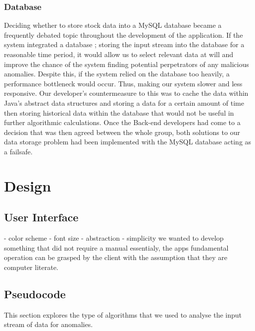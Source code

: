 \documentclass[12pt]{article}
\begin{document}
    \subsubsection{Database}
    Deciding whether to store stock data into a MySQL database became a frequently debated topic throughout the development of the application.
    If the system integrated a database ; storing the input stream into the database for a reasonable time period, it would allow us to
    select relevant data at will and improve the chance of the system finding potential perpetrators of any malicious anomalies.
    \newline
    Despite this, if the system relied on the database too heavily, a performance bottleneck would occur. Thus, making our system slower and less responsive.
    Our developer's countermeasure to this was to cache the data within Java's abstract data structures and storing a data for a certain amount
    of time then storing historical data within the database that would not be useful in further algorithmic calculations.
    \newline
    Once the Back-end developers had come to a decision that was then agreed between the whole group, both solutions to our data storage problem had
    been implemented with the MySQL database acting as a failsafe.
\section{Design}
  \subsection{User Interface}
    - color scheme
    - font size
    - abstraction
      - simplicity
         we wanted to develop something that did not require a manual essentialy,
         the apps fundamental operation can be grasped by the client with the assumption
         that they are computer literate.
  \subsection{Pseudocode}
    This section explores the type of algorithms that we used to analyse the input stream of data for anomalies.
\end{document}
